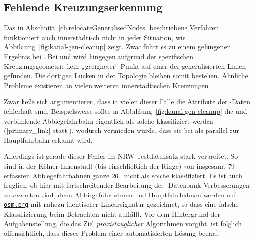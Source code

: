 \documentclass[../main/thesis.tex]{subfiles}
\begin{document}
\subsection{Fehlende Kreuzungserkennung}
\label{ch:missing-junction-detection}


Das in Abschnitt~\ref{ch:relocateGeneralisedNodes} beschriebene Verfahren funktioniert auch innerstädtisch nicht in jeder Situation, wie Abbildung~\ref{fig:kanal-gen-cleanup} zeigt.
Zwar führt es zu einem gelungenen Ergebnis bei .
Bei  und  wird hingegen aufgrund der spezifischen Kreuzungsgeometrie kein „geeigneter“ Punkt auf einer der generalisierten Linien gefunden.
Die dortigen Lücken in der Topologie bleiben somit bestehen.
Ähnliche Probleme existieren an vielen weiteren innerstädtischen Kreuzungen.

Zwar ließe sich argumentieren, dass in vielen dieser Fälle die Attribute der \osm-Daten fehlerhaft sind.
Beispielsweise sollte in Abbildung~\ref{fig:kanal-gen-cleanup} die  und  verbindende Abbiegefahrbahn eigentlich als solche klassifiziert werden ([primary\_link] statt ), wodurch vermieden würde, dass sie bei  als parallel zur Hauptfahrbahn erkannt wird. 

Allerdings ist gerade dieser Fehler im NRW-Testdatensatz stark verbreitet.
So sind in der Kölner Innenstadt (bis einschließlich der Ringe) von insgesamt 79~%
erfassten Abbiegefahrbahnen ganze 26~%
nicht als solche klassifiziert.
Es ist auch fraglich, ob hier mit fortschreitender Bearbeitung der \osm-Datenbank Verbesserungen zu erwarten sind, denn Abbiegefahrbahnen und Hauptfahrbahnen werden auf \href{https://www.openstreetmap.org/}{\nolinkurl{osm.org}} mit nahezu identischer Linearsignatur gezeichnet, so dass eine falsche Klassifizierung beim Betrachten nicht auffällt.
Vor dem Hintergrund der Aufgabenstellung, die das Ziel \emph{praxistauglicher} Algorithmen vorgibt, ist folglich offensichtlich, dass dieses Problem einer automatisierten Lösung bedarf.
\end{document}
